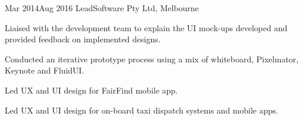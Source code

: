 {Mar 2014}{Aug 2016}
{LeadSoftware Pty Ltd, Melbourne}
{
  \item Liaised with the development team to explain the UI mock-ups developed and provided feedback on implemented designs.
  \item Conducted an iterative prototype process using a mix of whiteboard, Pixelmator, Keynote and FluidUI.
}
{
  \item Led UX and UI design for FairFind mobile app.
  \item Led UX and UI design for on-board taxi dispatch systems and mobile apps.
}

\vspace{-2\bigskipamount}